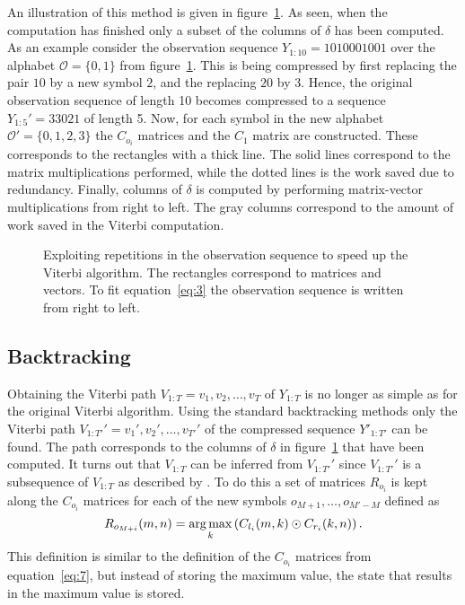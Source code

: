 An illustration of this method is given in
figure~\ref{fig:exploiting-repetitions}. As seen, when the computation has
finished only a subset of the columns of $\delta$ has been computed. As an
example consider the observation sequence $Y_{1:10} = 1010001001$ over the
alphabet $\mathcal{O} = \{0, 1\}$ from figure~\ref{fig:exploiting-repetitions}. This is being compressed by first replacing
the pair $10$ by a new symbol $2$, and the replacing $20$ by $3$. Hence, the
original observation sequence of length 10 becomes compressed to a sequence
$Y_{1:5}' = 33021$ of length 5. Now, for each symbol in the new alphabet
$\mathcal{O'} = \{0, 1, 2, 3\}$ the $C_{o_i}$ matrices and the $C_1$ matrix are
constructed. These corresponds to the rectangles with a thick line. The solid
lines correspond to the matrix multiplications performed, while the dotted
lines is the work saved due to redundancy. Finally, columns of $\delta$ is
computed by performing matrix-vector multiplications from right to left.
The gray columns correspond to the amount of work saved in the Viterbi
computation.

\begin{figure}
  \centering
  
  \caption{Exploiting repetitions in the observation sequence to speed up the
    Viterbi algorithm. The rectangles correspond to matrices and vectors. To
    fit equation~\eqref{eq:3} the observation sequence is written from right to
    left.}
  \label{fig:exploiting-repetitions}
\end{figure}

\subsection{Backtracking}
\label{sec:backtracking}

Obtaining the Viterbi path $V_{1:T} = v_1, v_2, \dots, v_T$ of $Y_{1:T}$ is no longer
as simple as for the original Viterbi algorithm. Using the standard
backtracking methods only the Viterbi path $V_{1:T'}' = v_1', v_2', \dots, v_{T'}'$
of the compressed sequence $Y'_{1:T'}$ can be found. The path corresponds to
the columns of $\delta$ in figure~\ref{fig:exploiting-repetitions} that have been
computed. It turns out that $V_{1:T}$ can be inferred from $V_{1:T'}'$ since $V_{1:T'}'$
is a subsequence of $V_{1:T}$ as described by \citet{lifshits2009speeding}. To do
this a set of matrices $R_{o_i}$ is kept along the $C_{o_i}$ matrices for each
of the new symbols $o_{M + 1}, \dots, o_{M' - M}$ defined as
\begin{equation*}
  R_{o_{M + i}}(m, n) = \operatorname*{arg\,max}_k
  \left(
    C_{l_i}(m, k) \odot C_{r_i}(k, n)
  \right).
\end{equation*}
This definition is similar to the definition of the $C_{o_i}$ matrices from
equation~\eqref{eq:7}, but instead of storing the maximum value, the state that
results in the maximum value is stored.

